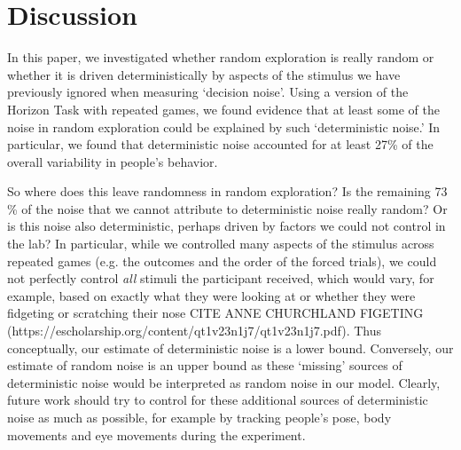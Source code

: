 \documentclass[12pt]{article}
\begin{document}
	
	
	
	\section*{Discussion}
	

	In this paper, we investigated whether random exploration is really random or whether it is driven deterministically by aspects of the stimulus we have previously ignored when measuring `decision noise'.  Using a version of the Horizon Task with repeated games, we found evidence that at least some of the noise in random exploration could be explained by such `deterministic noise.' In particular, we found that deterministic noise accounted for at least 27\% of the overall variability in people's behavior. %
		
	So where does this leave randomness in random exploration?  Is the remaining 73 \% of the noise that we cannot attribute to deterministic noise really random?  Or is this noise also deterministic, perhaps driven by factors we could not control in the lab?  In particular, while we controlled many aspects of the stimulus across repeated games (e.g. the outcomes and the order of the forced trials), we could not perfectly control {\it all} stimuli the participant received, which would vary, for example, based on exactly what they were looking at or whether they were fidgeting or scratching their nose CITE ANNE CHURCHLAND FIGETING (https://escholarship.org/content/qt1v23n1j7/qt1v23n1j7.pdf). Thus conceptually, our estimate of deterministic noise is a lower bound. Conversely, our estimate of random noise is an upper bound as these `missing' sources of deterministic noise would be interpreted as random noise in our model. Clearly, future work should try to control for these additional sources of deterministic noise as much as possible, for example by tracking people's pose, body movements and eye movements during the experiment.
	
\end{document}

